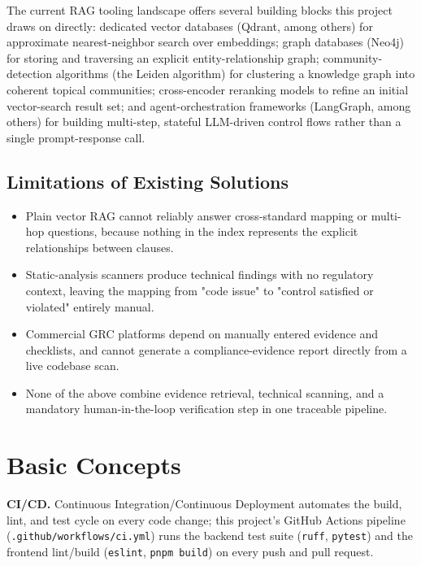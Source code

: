 \documentclass[12pt,a4paper]{report}
\begin{document}
The current \ac{RAG} tooling landscape offers several building blocks
this project draws on directly: dedicated vector databases (Qdrant, among
others) for approximate nearest-neighbor search over embeddings; graph
databases (Neo4j) for storing and traversing an explicit entity-relationship
graph; community-detection algorithms (the Leiden algorithm) for clustering
a knowledge graph into coherent topical communities; cross-encoder reranking
models to refine an initial vector-search result set; and agent-orchestration
frameworks (LangGraph, among others) for building multi-step, stateful
LLM-driven control flows rather than a single prompt-response call.

\subsection{Limitations of Existing Solutions}

\begin{itemize}
  \item Plain vector \ac{RAG} cannot reliably answer cross-standard mapping
        or multi-hop questions, because nothing in the index represents the
        explicit relationships between clauses.
  \item Static-analysis scanners produce technical findings with no
        regulatory context, leaving the mapping from "code issue" to
        "control satisfied or violated" entirely manual.
  \item Commercial \ac{GRC} platforms depend on manually entered evidence
        and checklists, and cannot generate a compliance-evidence report
        directly from a live codebase scan.
  \item None of the above combine evidence retrieval, technical scanning,
        and a mandatory human-in-the-loop verification step in one
        traceable pipeline.
\end{itemize}

\section{Basic Concepts}

\textbf{\ac{CI/CD}.} Continuous Integration/Continuous Deployment automates
the build, lint, and test cycle on every code change; this project's
GitHub Actions pipeline (\texttt{.github/workflows/ci.yml}) runs the backend
test suite (\texttt{ruff}, \texttt{pytest}) and the frontend lint/build
(\texttt{eslint}, \texttt{pnpm build}) on every push and pull request.
\end{document}
